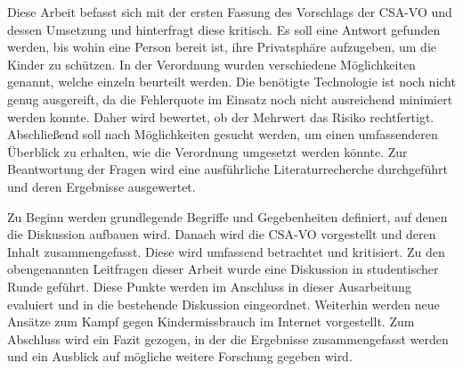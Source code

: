 Diese Arbeit befasst sich mit der ersten Fassung des Vorschlags der \ac{CSA-VO} und dessen Umsetzung und hinterfragt diese kritisch. Es soll eine Antwort gefunden werden, bis wohin eine Person bereit ist, ihre Privatsphäre aufzugeben, um die Kinder zu schützen. In der Verordnung wurden verschiedene Möglichkeiten genannt, welche einzeln beurteilt werden. Die benötigte Technologie ist noch nicht genug ausgereift, da die Fehlerquote im Einsatz noch nicht ausreichend minimiert werden konnte. Daher wird bewertet, ob der Mehrwert das Risiko rechtfertigt. Abschließend soll nach Möglichkeiten gesucht werden, um einen umfassenderen Überblick zu erhalten, wie die Verordnung umgesetzt werden könnte. Zur Beantwortung der Fragen wird eine ausführliche Literaturrecherche durchgeführt und deren Ergebnisse ausgewertet.


Zu Beginn werden grundlegende Begriffe und Gegebenheiten definiert, auf denen die Diskussion aufbauen wird. Danach wird die \ac{CSA-VO} vorgestellt und deren Inhalt zusammengefasst. Diese wird umfassend betrachtet und kritisiert. Zu den obengenannten Leitfragen dieser Arbeit wurde eine Diskussion in studentischer Runde geführt. Diese Punkte werden im Anschluss in dieser Ausarbeitung evaluiert und in die bestehende Diskussion eingeordnet. Weiterhin werden neue Ansätze zum Kampf gegen Kindermissbrauch im Internet vorgestellt. Zum Abschluss wird ein Fazit gezogen, in der die Ergebnisse zusammengefasst werden und ein Ausblick auf mögliche weitere Forschung gegeben wird.




